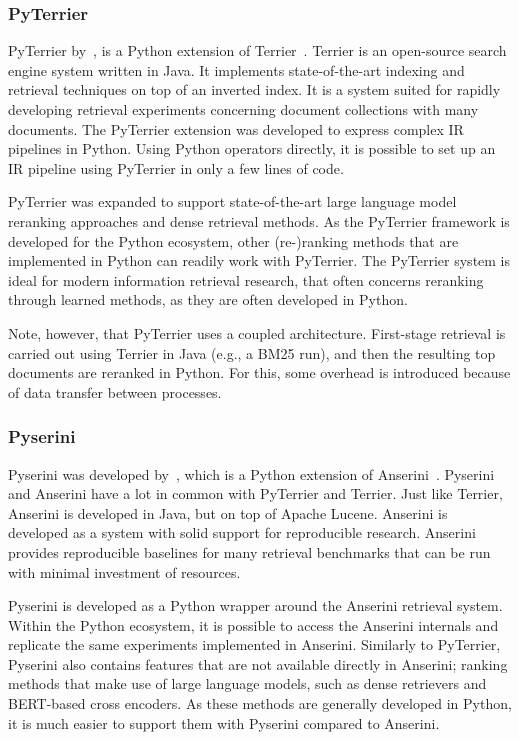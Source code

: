 \subsubsection{PyTerrier}
PyTerrier by~\citet{pyterrier}, is a Python extension of Terrier~\citep{terrier}. Terrier is an open-source search engine system written in Java. It implements state-of-the-art indexing and retrieval techniques on top of an inverted index. It is a system suited for rapidly developing retrieval experiments concerning document collections with many documents. 
The PyTerrier extension was developed to express complex IR pipelines in Python. Using Python operators directly, it is possible to set up an IR pipeline using PyTerrier in only a few lines of code. 

PyTerrier was expanded to support state-of-the-art large language model reranking approaches and dense retrieval methods. As the PyTerrier framework is developed for the Python ecosystem, other (re-)ranking methods that are implemented in Python can readily work with PyTerrier. The PyTerrier system is ideal for modern information retrieval research, that often concerns reranking through learned methods, as they are often developed in Python.

Note, however, that PyTerrier uses a coupled architecture. First-stage retrieval is carried out using Terrier in Java (e.g., a BM25 run), and then the resulting top documents are reranked in Python. For this, some overhead is introduced because of data transfer between processes. 

\subsubsection{Pyserini}
Pyserini was developed by~\citet{pyserini}, which is a Python extension of Anserini~\citep{anserini}. Pyserini and Anserini have a lot in common with PyTerrier and Terrier. Just like Terrier, Anserini is developed in Java, but on top of Apache Lucene. Anserini is developed as a system with solid support for reproducible research. Anserini provides reproducible baselines for many retrieval benchmarks that can be run with minimal investment of resources. 

Pyserini is developed as a Python wrapper around the Anserini retrieval system. Within the Python ecosystem, it is possible to access the Anserini internals and replicate the same experiments implemented in Anserini. Similarly to PyTerrier, Pyserini also contains features that are not available directly in Anserini; ranking methods that make use of large language models, such as dense retrievers and BERT-based cross encoders. As these methods are generally developed in Python, it is much easier to support them with Pyserini compared to Anserini.

